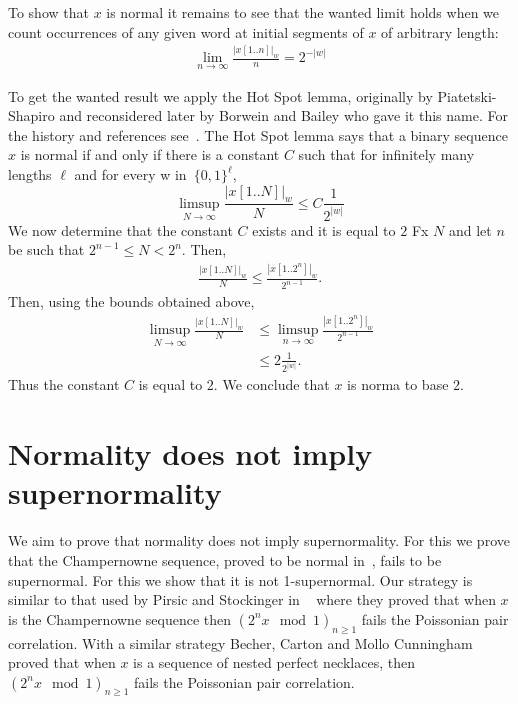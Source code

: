\documentclass[11pt,a4paper]{tesis}
\begin{document}
To show that $x$ is normal it remains to see that the wanted 
limit holds when we count occurrences of any given word at initial segments of $x$ of arbitrary length:
\begin{align*}
\lim_{n\to \infty}\frac{|x[1.. n]|_w }{ n}= {2^{-|w|}}
\end{align*}

To get the wanted result we apply the  Hot Spot lemma, originally by Piatetski-Shapiro  and reconsidered 
later by Borwein and Bailey \cite{hotspot}  who gave it this name. For  the history and references see~\cite[Theorem 7.4.1]{BC2018}.
The Hot Spot lemma says that a binary sequence $x$ is normal if and only if there is a constant $C$ 
such that for infinitely many lengths $\ell$ and for every w in~$\{0,1\}^\ell$,
    $$\limsup_{N\to \infty}  \frac{|x[1.. N]|_w }{N} \leq C \frac{1}{2^{|w|}}$$
 We now determine that the constant $C$ exists and it is equal to $2$
Fx $N$ and let $n$ be such that $2^{n-1}\leq N<2^{n}$. 
Then,
\begin{align*}
\frac{{|x[1.. N]|_w }}{N}\leq \frac{{|x[1.. 2^{n}]|_w }}{2^{n-1}}.
\end{align*}
Then, using the bounds obtained above,
\begin{align*}
\limsup_{N\to \infty}  \frac{|x[1.. N]|_w }{N} 
&\leq \limsup_{n\to \infty}\frac{{|x[1.. 2^{n}]|_w }}{2^{n-1}}\\
&\leq 2\frac{1}{2^{|w|}}.
\end{align*}
Thus the constant $C$ is equal to $2$.
We conclude that $x$ is norma to base $2$.
\pagebreak

\section{Normality does not imply supernormality}
We aim to prove that normality does not imply supernormality. 
For this we prove that the Champernowne sequence, proved to be normal in~\cite{champern}, 
fails to be supernormal. For this we show that  it is not 1-supernormal.
Our strategy is similar to that used by Pirsic and Stockinger in ~\cite{PS2019}  where they proved that when $x$ is 
the Champernowne 
sequence then $(2^n x \mod 1)_{n\geq 1}$ fails the Poissonian pair correlation.
With a similar strategy  Becher, Carton and Mollo Cunningham ~\cite{BCC2019}
 proved that when $x$ is a sequence of nested perfect necklaces, then $(2^n x \mod 1)_{n\geq 1}$ fails the Poissonian pair correlation.
\end{document}
